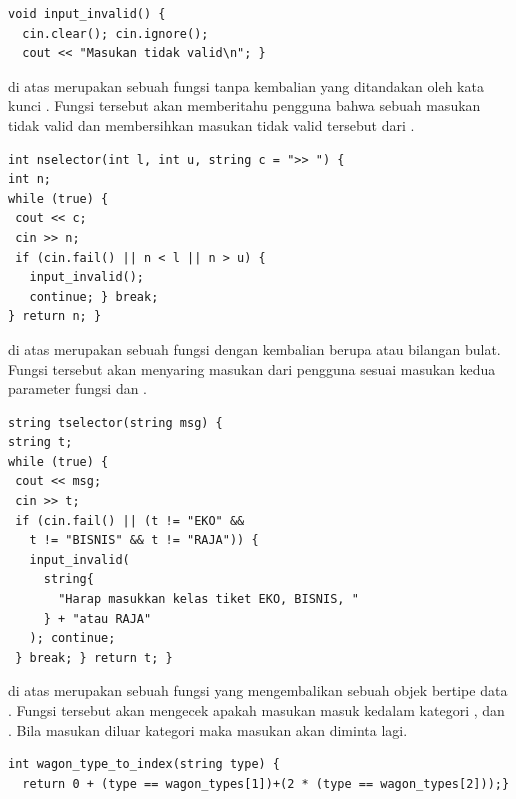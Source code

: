 \documentclass[../main.tex]{subfiles}
\begin{document}
\begin{code}
\begin{verbatim}
void input_invalid() {
  cin.clear(); cin.ignore();
  cout << "Masukan tidak valid\n"; }
\end{verbatim}
\end{code}

{\Script} di atas merupakan sebuah fungsi tanpa kembalian yang ditandakan oleh kata kunci . Fungsi tersebut akan memberitahu pengguna bahwa sebuah masukan tidak valid dan membersihkan masukan tidak valid tersebut dari {\ioi} {\stream}.

\begin{code}
\begin{verbatim}
int nselector(int l, int u, string c = ">> ") {
int n;
while (true) {
 cout << c;
 cin >> n;
 if (cin.fail() || n < l || n > u) {
   input_invalid();
   continue; } break;
} return n; }
\end{verbatim}
\end{code}

{\Script} di atas merupakan sebuah fungsi dengan kembalian berupa  atau bilangan bulat. Fungsi tersebut akan menyaring masukan dari pengguna sesuai masukan kedua parameter fungsi  dan .

\begin{code}
\begin{verbatim}
string tselector(string msg) {
string t;
while (true) {
 cout << msg;
 cin >> t; 
 if (cin.fail() || (t != "EKO" &&
   t != "BISNIS" && t != "RAJA")) {
   input_invalid(
     string{
       "Harap masukkan kelas tiket EKO, BISNIS, "
     } + "atau RAJA"
   ); continue;
 } break; } return t; }
\end{verbatim}
\end{code}

{\Script} di atas merupakan sebuah fungsi yang mengembalikan sebuah objek bertipe data . Fungsi tersebut akan mengecek apakah masukan masuk kedalam kategori ,  dan . Bila masukan diluar kategori maka masukan akan diminta lagi.

\begin{code}
\begin{verbatim}
int wagon_type_to_index(string type) {
  return 0 + (type == wagon_types[1])+(2 * (type == wagon_types[2]));}
\end{verbatim}
\end{code}
\end{document}
